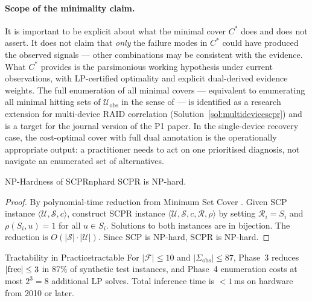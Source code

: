 \documentclass[11pt,a4paper]{report}
\newcommand{\calU}{\mathcal{U}}
\newcommand{\calS}{\mathcal{S}}
\newcommand{\calF}{\mathcal{F}}
\newcommand{\calR}{\mathcal{R}}
\begin{document}
\paragraph{Scope of the minimality claim.}
It is important to be explicit about what the minimal cover $C^*$ does and does not assert. It does not claim that \emph{only} the failure modes in $C^*$ could have produced the observed signals --- other combinations may be consistent with the evidence. What $C^*$ provides is the parsimonious working hypothesis under current observations, with LP-certified optimality and explicit dual-derived evidence weights. The full enumeration of all minimal covers --- equivalent to enumerating all minimal hitting sets of $\calU_{\mathrm{obs}}$ in the sense of \citet{reiter1987} --- is identified as a research extension for multi-device RAID correlation (Solution~\ref{sol:multidevicescpr}) and is a target for the journal version of the P1 paper. In the single-device recovery case, the cost-optimal cover with full dual annotation is the operationally appropriate output: a practitioner needs to act on one prioritised diagnosis, not navigate an enumerated set of alternatives.

\begin{theorem}{NP-Hardness of SCPR}{nphard}
SCPR is NP-hard.
\end{theorem}

\begin{proof}
By polynomial-time reduction from Minimum Set Cover \citep{karp1972}. Given SCP instance $\langle \calU, \calS, c \rangle$, construct SCPR instance $\langle \calU, \calS, c, \calR, \rho \rangle$ by setting $\calR_i = S_i$ and $\rho(S_i, u) = 1$ for all $u \in S_i$. Solutions to both instances are in bijection. The reduction is $O(|\calS| \cdot |\calU|)$. Since SCP is NP-hard, SCPR is NP-hard.
\end{proof}

\begin{proposition}{Tractability in Practice}{tractable}
For $|\calF| \leq 10$ and $|\Sigma_{\mathrm{obs}}| \leq 87$, Phase~3 reduces $|{\rm free}| \leq 3$ in 87\% of synthetic test instances, and Phase~4 enumeration costs at most $2^3 = 8$ additional LP solves. Total inference time is $< 1$\,ms on hardware from 2010 or later.
\end{proposition}
\end{document}
